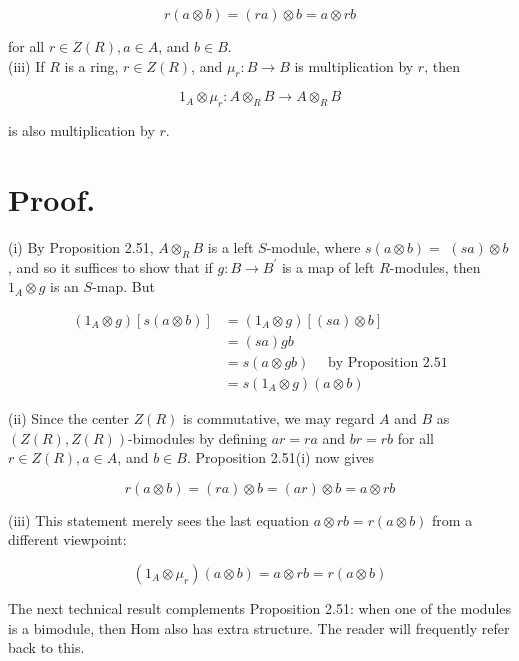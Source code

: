\documentclass[10pt, letterpaper]{article}
\begin{document}
$$
r(a \otimes b)=(r a) \otimes b=a \otimes r b
$$

for all $r \in Z(R), a \in A$, and $b \in B$.\\
(iii) If $R$ is a ring, $r \in Z(R)$, and $\mu_{r}: B \rightarrow B$ is multiplication by $r$, then

$$
1_{A} \otimes \mu_{r}: A \otimes_{R} B \rightarrow A \otimes_{R} B
$$

is also multiplication by $r$.

\section*{Proof.}
(i) By Proposition 2.51, $A \otimes_{R} B$ is a left $S$-module, where $s(a \otimes b)=$ $(s a) \otimes b$, and so it suffices to show that if $g: B \rightarrow B^{\prime}$ is a map of left $R$-modules, then $1_{A} \otimes g$ is an $S$-map. But

$$
\begin{aligned}
\left(1_{A} \otimes g\right)[s(a \otimes b)] & =\left(1_{A} \otimes g\right)[(s a) \otimes b] \\
& =(s a) g b \\
& =s(a \otimes g b) \quad \text { by Proposition } 2.51 \\
& =s\left(1_{A} \otimes g\right)(a \otimes b)
\end{aligned}
$$

(ii) Since the center $Z(R)$ is commutative, we may regard $A$ and $B$ as $(Z(R), Z(R))$-bimodules by defining $a r=r a$ and $b r=r b$ for all $r \in Z(R), a \in A$, and $b \in B$. Proposition 2.51(i) now gives

$$
r(a \otimes b)=(r a) \otimes b=(a r) \otimes b=a \otimes r b
$$

(iii) This statement merely sees the last equation $a \otimes r b=r(a \otimes b)$ from a different viewpoint:

$$
\left(1_{A} \otimes \mu_{r}\right)(a \otimes b)=a \otimes r b=r(a \otimes b)
$$

The next technical result complements Proposition 2.51: when one of the modules is a bimodule, then Hom also has extra structure. The reader will frequently refer back to this.
\end{document}
